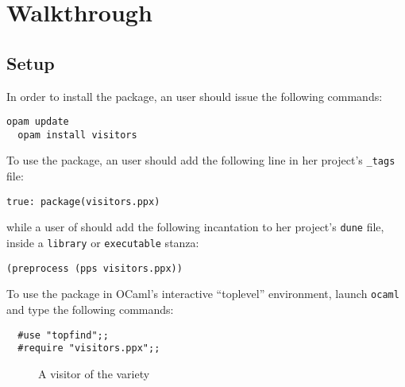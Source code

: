 \documentclass[11pt,a4paper,twoside]{article}
\begin{document}

\section{Walkthrough}


\subsection{Setup}
\label{sec:intro:setup}

\enlargethispage{\baselineskip}

In order to install the \visitors package, an \opam user should issue the
following commands:
\begin{lstlisting}[keywords={}]
  opam update
  opam install visitors
\end{lstlisting}
To use the package, an \ocamlbuild user should add the
following line in her project's \texttt{\_tags} file:
\begin{lstlisting}[keywords={}]
  true: package(visitors.ppx)
\end{lstlisting}
while a user of \dune should add the following incantation
to her project's \texttt{dune} file,
inside a \texttt{library} or \texttt{executable} stanza:
\begin{lstlisting}[keywords={}]
  (preprocess (pps visitors.ppx))
\end{lstlisting}
To use the \visitors package in OCaml's interactive ``toplevel'' environment,
launch \texttt{ocaml} and type the following commands:
\begin{lstlisting}
  #use "topfind";;
  #require "visitors.ppx";;
\end{lstlisting}


\begin{figure}[t]
\vspace{-\baselineskip}
\caption{A visitor of the \iter variety}
\label{fig:expr00}
\end{figure}
\end{document}
